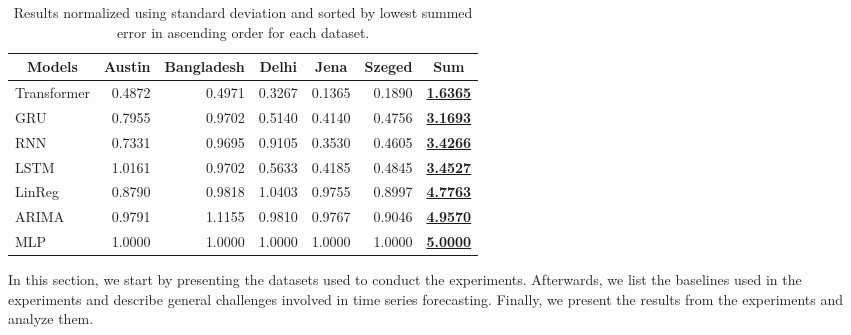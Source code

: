 \begin{table*}[t]
    \centering
    \caption {Results normalized using standard deviation and sorted by lowest summed error in ascending order for each dataset.} \label{tab:ResultsTableSummed} 
    \begin{tabular}{|l|r|r|r|r|r|r|}
    \hline
        \multicolumn{1}{|c|}{Models} & \multicolumn{1}{c|}{Austin} & \multicolumn{1}{c|}{Bangladesh} & \multicolumn{1}{c|}{Delhi} & \multicolumn{1}{c|}{Jena} & \multicolumn{1}{c|}{Szeged} & \multicolumn{1}{c|}{Sum} \\ \hline
        Transformer & 0.4872 & 0.4971 & 0.3267 & 0.1365 & 0.1890 & {\ul{\textbf{1.6365}}} \\ \hline
        GRU & 0.7955 & 0.9702 & 0.5140 & 0.4140 & 0.4756 & {\ul{\textbf{3.1693}}} \\ \hline
        RNN & 0.7331 & 0.9695 & 0.9105 & 0.3530 & 0.4605 & {\ul{\textbf{3.4266}}} \\ \hline
        LSTM & 1.0161 & 0.9702 & 0.5633 & 0.4185 & 0.4845 & {\ul{\textbf{3.4527}}} \\ \hline
        LinReg & 0.8790 & 0.9818 & 1.0403 & 0.9755 & 0.8997 & {\ul{\textbf{4.7763}}} \\ \hline
        ARIMA & 0.9791 & 1.1155 & 0.9810 & 0.9767 & 0.9046 & {\ul{\textbf{4.9570}}} \\ \hline
        MLP & 1.0000 & 1.0000 & 1.0000 & 1.0000 & 1.0000 & {\ul{\textbf{5.0000}}} \\ \hline
    \end{tabular}
\end{table*}

In this section, we start by presenting the datasets used to conduct the experiments.
Afterwards, we list the baselines used in the experiments and describe general challenges involved in time series forecasting.
Finally, we present the results from the experiments and analyze them.

